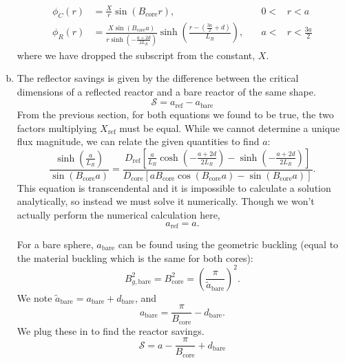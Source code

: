 \begin{enumerate}[a)]
$$\boxed{\begin{aligned}
\quad \phi_C(r) &= \frac{X}{r} \sin\left(B_{\text{core}} r\right) ,& \quad 0 <& r < a \quad \\
\quad \phi_R(r) &= \frac{X \sin\left(B_{\text{core}} a\right)}{r \sinh\left(-\frac{a+2d}{2L_R}\right)}\sinh\left(\frac{r-\left(\frac{3a}{2}+d\right)}{L_R}\right),& \quad a <& r < \frac{3a}{2} \quad
\end{aligned}}$$
where we have dropped the subscript from the constant, $X$. \\

\item

The reflector savings is given by the difference between the critical dimensions of a reflected reactor and a bare reactor of the same shape.
$$ \mathcal{S} = a_{\text{ref}} - a_{\text{bare}} $$
From the previous section, for both equations we found to be true, the two factors multiplying $X_{\text{ref}}$ must be equal. While we cannot determine a unique flux magnitude, we can relate the given quantities to find $a$:
$$ \frac{\sinh\left(\frac{a}{L_R}\right)}{\sin\left(B_{\text{core}} a\right)} = \frac{D_{\text{ref}} \left[\frac{a}{L_R}\cosh\left(-\frac{a+2d}{2L_R}\right) - \sinh\left(-\frac{a+2d}{2L_R}\right)\right]}{D_{\text{core}} \left[a B_{\text{core}} \cos\left(B_{\text{core}} a\right) - \sin\left(B_{\text{core}} a\right)\right]}.$$
This equation is transcendental and it is impossible to calculate a solution analytically, so instead we must solve it numerically. Though we won't actually perform the numerical calculation here,
$$ a_{\text{ref}} = a .$$

For a bare sphere, $a_{\text{bare}}$ can be found using the geometric buckling (equal to the material buckling which is the same for both cores):
$$ B_{g,\text{bare}}^2 = B_{\text{core}}^2 = \left(\frac{\pi}{\tilde{a}_{\text{bare}}}\right)^2 .$$
We note $\tilde{a}_{\text{bare}} = a_{\text{bare}} + d_{\text{bare}}$, and
$$ a_{\text{bare}} = \frac{\pi}{B_{\text{core}}} - d_{\text{bare}} .$$
We plug these in to find the reactor savings.
$$\boxed{ \mathcal{S} = a - \frac{\pi}{B_{\text{core}}} + d_{\text{bare}} }$$
\end{enumerate}

